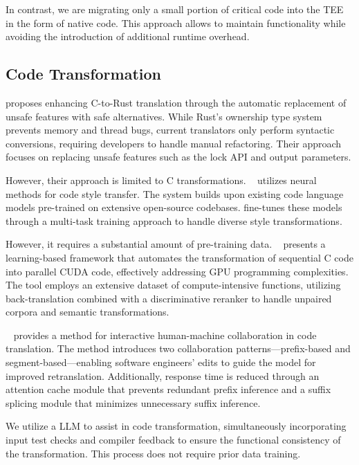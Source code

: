 In contrast, we are migrating only a small portion of critical code into the TEE in the form of native code. This approach allows \system to maintain functionality while avoiding the introduction of additional runtime overhead.

\subsection{Code Transformation}
\citet{hong2023improving} proposes enhancing C-to-Rust translation through the automatic replacement of unsafe features with safe alternatives. 
While Rust's ownership type system prevents memory and thread bugs, current translators only perform syntactic conversions, requiring developers to handle manual refactoring. 
Their approach focuses on replacing unsafe features such as the lock API and output parameters.

However, their approach is limited to C transformations.
%
~\cite{ting2023codestylist} utilizes neural methods for code style transfer. The system builds upon existing code language models pre-trained on extensive open-source codebases. 
 fine-tunes these models through a multi-task training approach to handle diverse style transformations.

However, it requires a substantial amount of pre-training data.
~\cite{wen2022babeltower} presents a learning-based framework that automates the transformation of sequential C code into parallel CUDA code, effectively addressing GPU programming complexities. 
The tool employs an extensive dataset of compute-intensive functions, utilizing back-translation combined with a discriminative reranker to handle unpaired corpora and semantic transformations.

~\cite{liu2024hmcodetrans} provides a method for interactive human-machine collaboration in code translation. The method introduces two collaboration patterns—prefix-based and segment-based—enabling software engineers' edits to guide the model for improved retranslation. Additionally, response time is reduced through an attention cache module that prevents redundant prefix inference and a suffix splicing module that minimizes unnecessary suffix inference.

We utilize a LLM to assist in code transformation, simultaneously incorporating input test checks and compiler feedback to ensure the functional consistency of the transformation. This process does not require prior data training.